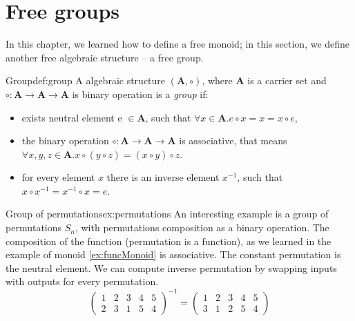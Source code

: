 \section{Free groups}
In this chapter, we learned how to define a free monoid; in this section, we define another free algebraic structure -- a free group.
\begin{defi}{Group}{def:group}
A algebraic structure $(\mathbf{A}, \circ)$, where $\mathbf{A}$ is a carrier set and $\circ: \mathbf{A} \rightarrow  \mathbf{A} \rightarrow \mathbf{A}$ is binary operation is a \emph{group} \cite{AbstractAlgebra} if:
\begin{itemize}
    \itemsep 0em 
    \item exists neutral element e $\in \mathbf{A}$, such that $\forall x \in \mathbf{A}. e \circ x = x = x \circ e$,
    \item the binary operation $\circ: \mathbf{A} \rightarrow  \mathbf{A} \rightarrow \mathbf{A}$ is associative, that means $\forall x, y, z \in \mathbf{A}. x \circ (y \circ z) = (x \circ y) \circ z$.
    \item for every element $x$ there is an inverse element $x^{-1}$, such that $x \circ x^{-1} = x^{-1} \circ x = e$.
\end{itemize}
\end{defi}
\begin{example}{Group of permutations}{ex:permutations}
An interesting example is a group of permutations $S_n$, with permutations composition as a binary operation. The composition of the function (permutation is a function), as we learned in the example of monoid \ref{ex:funcMonoid} is associative. The constant permutation is the neutral element. We can compute inverse permutation by swapping inputs with outputs for every permutation.
$$
\begin{pmatrix}
    1 & 2 & 3 & 4 & 5 \\
    2 & 3 & 1 & 5 & 4
\end{pmatrix}^{-1}
=
\begin{pmatrix}
    1 & 2 & 3 & 4 & 5 \\
    3 & 1 & 2 & 5 & 4
\end{pmatrix}
$$
\end{example}
